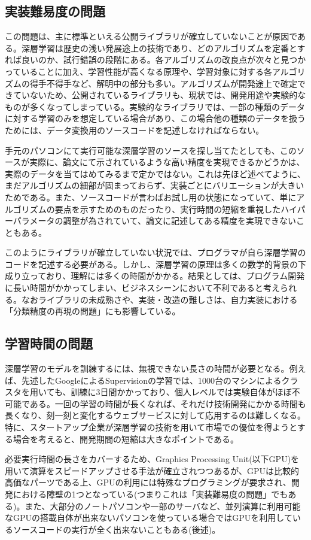 \subsection{実装難易度の問題}
この問題は、主に標準といえる公開ライブラリが確立していないことが原因である。深層学習は歴史の浅い発展途上の技術であり、どのアルゴリズムを定番とすれば良いのか、試行錯誤の段階にある。各アルゴリズムの改良点が次々と見つかっていることに加え、学習性能が高くなる原理や、学習対象に対する各アルゴリズムの得手不得手など、解明中の部分も多い。アルゴリズムが開発途上で確定できていないため、公開されているライブラリも、現状では、開発用途や実験的なものが多くなってしまっている。実験的なライブラリでは、一部の種類のデータに対する学習のみを想定している場合があり、この場合他の種類のデータを扱うためには、データ変換用のソースコードを記述しなければならない。\par
手元のパソコンにて実行可能な深層学習のソースを探し当てたとしても、このソースが実際に、論文にて示されているような高い精度を実現できるかどうかは、実際のデータを当てはめてみるまで定かではない。これは先ほど述べてように、まだアルゴリズムの細部が固まっておらず、実装ごとにバリエーションが大きいためである。また、ソースコードが言わばお試し用の状態になっていて、単にアルゴリズムの要点を示すためのものだったり、実行時間の短縮を重視したハイパーパラメータの調整が為されていて、論文に記述してある精度を実現できないこともある。\par
このようにライブラリが確立していない状況では、プログラマが自ら深層学習のコードを記述する必要がある。しかし、深層学習の原理は多くの数学的背景の下成り立っており、理解には多くの時間がかかる。結果としては、プログラム開発に長い時間がかかってしまい、ビジネスシーンにおいて不利であると考えられる。なおライブラリの未成熟さや、実装・改造の難しさは、自力実装における「分類精度の再現の問題」にも影響している。\par

\subsection{学習時間の問題}
深層学習のモデルを訓練するには、無視できない長さの時間が必要となる。例えば、先述したGoogleによるSupervisionの学習では、1000台のマシンによるクラスタを用いても、訓練に3日間かかっており、個人レベルでは実験自体がほぼ不可能である\cite{le2012building}。一回の学習の時間が長くなれば、それだけ技術開発にかかる時間も長くなり、刻一刻と変化するウェブサービスに対して応用するのは難しくなる。特に、スタートアップ企業が深層学習の技術を用いて市場での優位を得ようとする場合を考えると、開発期間の短縮は大きなポイントである\cite{ries2011the-lean}。\par
必要実行時間の長さをカバーするため、Graphics Processing Unit(以下GPU)を用いて演算をスピードアップさせる手法が確立されつつあるが、GPUは比較的高価なパーツである上、GPUの利用には特殊なプログラミングが要求され、開発における障壁の1つとなっている(つまりこれは「実装難易度の問題」でもある)。また、大部分のノートパソコンや一部のサーバなど、並列演算に利用可能なGPUの搭載自体が出来ないパソコンを使っている場合ではGPUを利用しているソースコードの実行が全く出来ないこともある(後述)。\par


